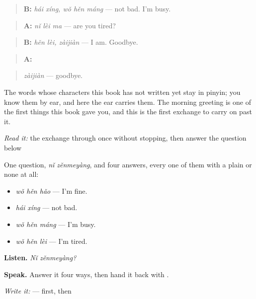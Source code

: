 \begin{quote}
\textbf{B:} \emph{hái xíng, wǒ hěn máng} — not bad. I'm busy.
\end{quote}

\begin{quote}
\textbf{A:} \emph{nǐ lèi ma} — are you tired?
\end{quote}

\begin{quote}
\textbf{B:} \emph{hěn lèi, zàijiàn} — I am. Goodbye.
\end{quote}

\begin{quote}
\textbf{A:} 
\end{quote}

\begin{quote}
\emph{zàijiàn} — goodbye.
\end{quote}

The words whose characters this book has not written yet stay in pinyin; you know them by ear, and here the ear carries them. The morning greeting is one of the first things this book gave you, and this is the first exchange to carry on past it.

\begin{tcolorbox}[breakable,skin=enhanced,colback=orange!6,colframe=orange!45!black,boxrule=0.5pt,arc=1mm,left=6pt,right=6pt,top=4pt,bottom=4pt,fonttitle=\bfseries,title={Read this}]
\emph{Read it:} the exchange through once without stopping, then answer the question below
\end{tcolorbox}

\begin{grammarlens}[title={What you've built — four answers to one question}]
One question, \emph{nǐ zěnmeyàng}, and four answers, every one of them with a plain  or none at all:

\begin{itemize}
\raggedright
  \item \emph{wǒ hěn hǎo} — I'm fine.
  \item \emph{hái xíng} — not bad.
  \item \emph{wǒ hěn máng} — I'm busy.
  \item \emph{wǒ hěn lèi} — I'm tired.
\end{itemize}

\textbf{Listen.} \emph{Nǐ zěnmeyàng?}

\textbf{Speak.} Answer it four ways, then hand it back with .

\emph{Write it:}  —  first, then 
\end{grammarlens}

